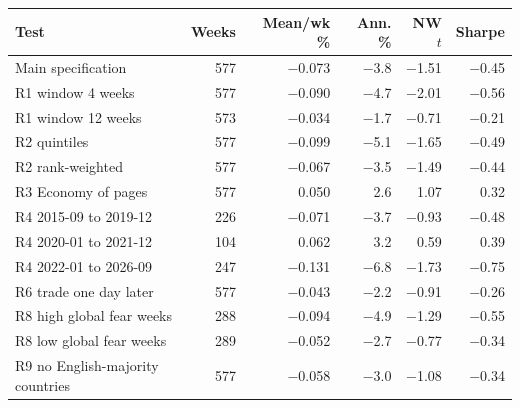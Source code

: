 \begin{tabular}{lrrrrr}
\toprule
Test & Weeks & Mean/wk \% & Ann. \% & NW $t$ & Sharpe \\
\midrule
Main specification & 577 & $-$0.073 & $-$3.8 & $-$1.51 & $-$0.45 \\
R1 window 4 weeks & 577 & $-$0.090 & $-$4.7 & $-$2.01 & $-$0.56 \\
R1 window 12 weeks & 573 & $-$0.034 & $-$1.7 & $-$0.71 & $-$0.21 \\
R2 quintiles & 577 & $-$0.099 & $-$5.1 & $-$1.65 & $-$0.49 \\
R2 rank-weighted & 577 & $-$0.067 & $-$3.5 & $-$1.49 & $-$0.44 \\
R3 Economy of pages & 577 & 0.050 & 2.6 & 1.07 & 0.32 \\
R4 2015-09 to 2019-12 & 226 & $-$0.071 & $-$3.7 & $-$0.93 & $-$0.48 \\
R4 2020-01 to 2021-12 & 104 & 0.062 & 3.2 & 0.59 & 0.39 \\
R4 2022-01 to 2026-09 & 247 & $-$0.131 & $-$6.8 & $-$1.73 & $-$0.75 \\
R6 trade one day later & 577 & $-$0.043 & $-$2.2 & $-$0.91 & $-$0.26 \\
R8 high global fear weeks & 288 & $-$0.094 & $-$4.9 & $-$1.29 & $-$0.55 \\
R8 low global fear weeks & 289 & $-$0.052 & $-$2.7 & $-$0.77 & $-$0.34 \\
R9 no English-majority countries & 577 & $-$0.058 & $-$3.0 & $-$1.08 & $-$0.34 \\
\bottomrule
\end{tabular}